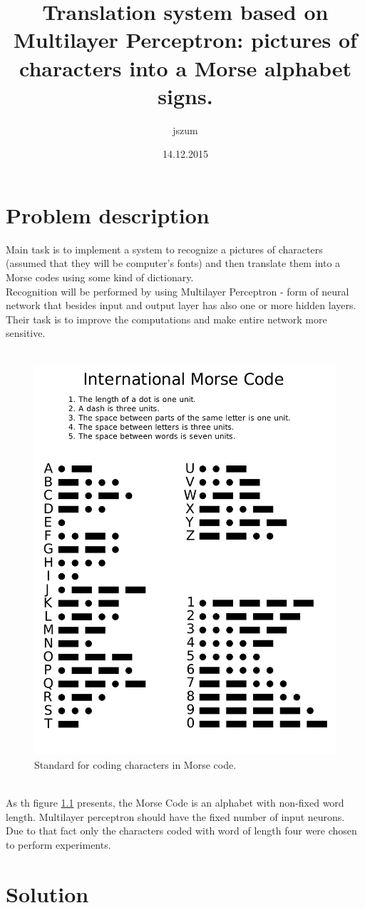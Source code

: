 \documentclass[eng,openany]{mgr}
\author{jszum}
\title{Translation system based on Multilayer Perceptron: pictures of characters into a Morse alphabet signs.}
\date{14.12.2015}
\begin{document}
\maketitle
\tableofcontents
\chapter{Problem description}

Main task is to implement a system to recognize a pictures of characters (assumed that they will be computer's fonts) and then translate them into a Morse codes using some kind of dictionary.\\
Recognition will be performed by using Multilayer Perceptron - form of neural network that besides input and output layer has also one or more hidden layers. Their task is to improve the computations and make entire network more sensitive.
\\\\
\begin{figure}[h]
\centering
\includegraphics[width=0.5\linewidth]{./morse}
\caption{Standard for coding characters in Morse code.}
\label{fig:morse}
\end{figure}
\\
As th figure \ref{fig:morse} presents, the Morse Code is an alphabet with non-fixed word length. Multilayer perceptron should have the fixed number of input neurons. Due to that fact only the characters coded with word of length four were chosen to perform experiments.
\chapter{Solution}
\end{document}
